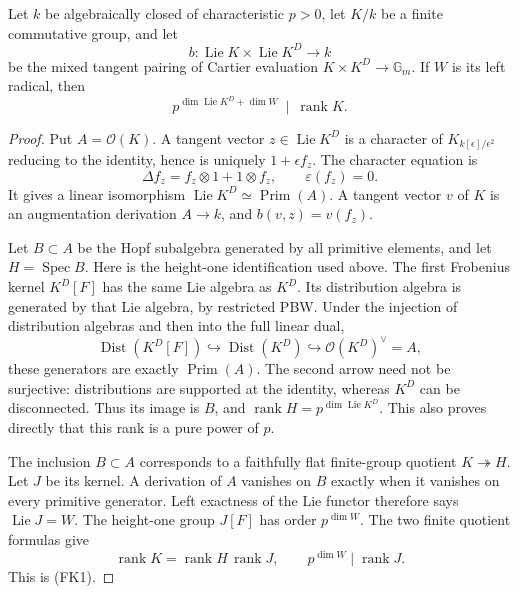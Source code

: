 \begin{srlemma}
\label{lem:sr-finite-group-tangent-bound}
Let \(k\) be algebraically closed of characteristic \(p>0\),
let \(K/k\) be a finite commutative group, and let
\[
 b:\operatorname{Lie}K\times\operatorname{Lie}K^D\to k
\]
be the mixed tangent pairing of Cartier evaluation
\(K\times K^D\to\mathbb G_m\).
If \(W\) is its left radical, then
\[
       p^{\dim\operatorname{Lie}K^D+\dim W}
                              \ \mid\ \operatorname{rank}K .
 \tag{FK1}
\]
\end{srlemma}
\begin{proof}
Put \(A=\mathcal O(K)\).
A tangent vector \(z\in\operatorname{Lie}K^D\) is a character
of \(K_{k[\epsilon]/\epsilon^2}\) reducing to the identity,
hence is uniquely \(1+\epsilon f_z\).
The character equation is
\[
 \Delta f_z=f_z\otimes1+1\otimes f_z,\qquad \varepsilon(f_z)=0 .
\]
It gives a linear isomorphism
\(\operatorname{Lie}K^D\simeq\operatorname{Prim}(A)\).
A tangent vector \(v\) of \(K\) is an augmentation derivation
\(A\to k\), and \(b(v,z)=v(f_z)\).

Let \(B\subset A\) be the Hopf subalgebra generated by all
primitive elements, and let \(H=\operatorname{Spec}B\).
Here is the height-one identification used above.
The first Frobenius kernel \(K^D[F]\) has the same Lie
algebra as \(K^D\).  Its distribution algebra is generated
by that Lie algebra, by restricted PBW.  Under the injection
of distribution algebras and then into the full linear dual,
\[
 \operatorname{Dist}(K^D[F])
     \hookrightarrow\operatorname{Dist}(K^D)
     \hookrightarrow \mathcal O(K^D)^\vee=A,
\]
these generators are exactly \(\operatorname{Prim}(A)\).
The second arrow need not be surjective: distributions are
supported at the identity, whereas \(K^D\) can be disconnected.
Thus its image is \(B\), and
\(\operatorname{rank}H=p^{\dim\operatorname{Lie}K^D}\).
This also proves directly that this rank is a pure power of \(p\).

The inclusion \(B\subset A\) corresponds to a faithfully flat
finite-group quotient \(K\twoheadrightarrow H\).
Let \(J\) be its kernel.
A derivation of \(A\) vanishes on \(B\) exactly when it vanishes
on every primitive generator.  Left exactness of the Lie
functor therefore says \(\operatorname{Lie}J=W\).
The height-one group \(J[F]\) has order \(p^{\dim W}\).
The two finite quotient formulas give
\[
 \operatorname{rank}K=\operatorname{rank}H\,
                              \operatorname{rank}J,\qquad
               p^{\dim W}\mid\operatorname{rank}J.
\]
This is (FK1).
\end{proof}

